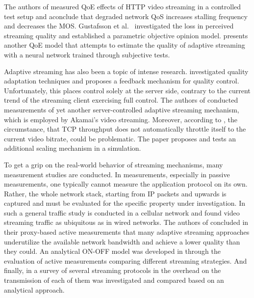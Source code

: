 The authors of \cite{mokmeasuring} measured \gls{QoE} effects of \gls{HTTP} video streaming in a controlled test setup and aconclude that degraded network \gls{QoS} increases stalling frequency and decreases the \gls{MOS}. Gustafsson et al.~\cite{gustafsson2008measuring} investigated the loss in perceived streaming quality and established a parametric objective opinion model. \cite{6181070} presents another \gls{QoE} model that attempts to estimate the quality of adaptive streaming with a neural network trained through subjective tests.

Adaptive streaming has also been a topic of intense research. \cite{DeCicco:2011:FCA:1943552.1943573} investigated quality adaptation techniques and proposes a feedback mechanism for quality control. Unfortunately, this places control solely at the server side, contrary to the current trend of the streaming client exercising full control. The authors of \cite{cicco2010akamai} conducted measurements of yet another server-controlled adaptive streaming mechanism, which is employed by Akamai's video streaming. Moreover, according to \cite{5945211}, the circumstance, that \gls{TCP} throughput does not automatically throttle itself to the current video bitrate, could be problematic. The paper proposes and tests an additional scaling mechanism in a simulation.

To get a grip on the real-world behavior of streaming mechanisms, many measurement studies are conducted. In measurements, especially in passive measurements, one typically cannot measure the application protocol on its own. Rather, the whole network stack, starting from \gls{IP} packets and upwards is captured and must be evaluated for the specific property under investigation. In \cite{Erman:2011:OTV:2068816.2068829} such a general traffic study is conducted in a cellular network and found video streaming traffic as ubiquitous as in wired networks. The authors of \cite{Huang:2012:CTU:2398776.2398800} concluded in their proxy-based active measurements that many adaptive streaming approaches underutilize the available network bandwidth and achieve a lower quality than they could. An analytical ON-OFF model was developed in \cite{Rao:2011:NCV:2079296.2079321} through the evaluation of active measurements comparing different streaming strategies. And finally, in a survey of several streaming protocols in \cite{5703713} the overhead on the transmission of each of them was investigated and compared based on an analytical approach. 


